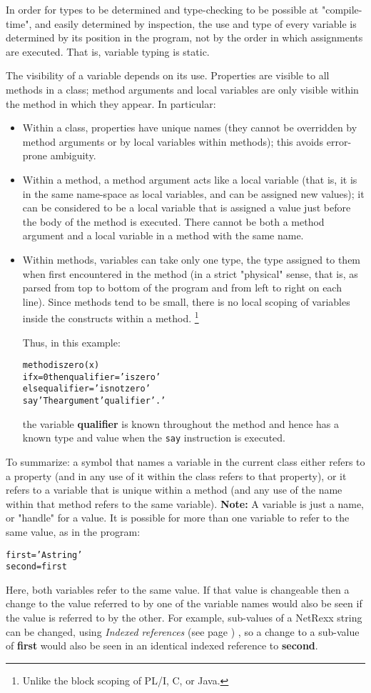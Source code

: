 In order for types to be determined and type-checking to be possible at
"compile-time", and easily determined by inspection, the use and
type of every variable is determined by its position in the program, not
by the order in which assignments are executed.
That is, variable typing is static.
 
The visibility of a variable depends on its use.  Properties are
visible to all methods in a class; method arguments and local variables
are only visible within the method in which they appear.  In particular:
\begin{itemize}
\item Within a class, properties have unique names (they cannot be
overridden by method arguments or by local variables within
methods); this avoids error-prone ambiguity.
\item 
Within a method, a method argument acts like a local variable (that is,
it is in the same name-space as local variables, and can be assigned new
values); it can be considered to be a local variable that is assigned a
value just before the body of the method is executed.  There cannot be
both a method argument and a local variable in a method with the same
name.
\item 
Within methods, variables can take only one type, the type assigned to
them when first encountered in the method (in a strict "physical"
sense, that is, as parsed from top to bottom of the program and from
left to right on each line).
Since methods tend to be small, there is no local scoping of variables
inside the constructs within a method.
\footnote{
Unlike the block scoping of PL/I, C, or Java.
}
 
Thus, in this example:
\begin{alltt}
method iszero(x)
  if x=0 then qualifier='is zero'
         else qualifier='is not zero'
  say 'The argument' qualifier'.'
\end{alltt}
the variable \textbf{qualifier} is known throughout the method and
hence has a known type and value when the \texttt{say} instruction is
executed.
\end{itemize}
 
To summarize: a symbol that names a variable in the current class either
refers to a property (and in any use of it within the class refers to
that property), or it refers to a variable that is unique within a
method (and any use of the name within that method refers to the same
variable).
\textbf{Note: }
A variable is just a name, or "handle" for a value.
It is possible for more than one variable to refer to the same value, as
in the program:
\begin{alltt}
first='A string'
second=first
\end{alltt}
Here, both variables refer to the same value.  If that value is
changeable then a change to the value referred to by one of the
variable names would also be seen if the value is referred to by the
other.
For example, sub-values of a NetRexx string can be changed, using
 \emph{Indexed references} (see page \pageref{refinstr}) , so a change to a
sub-value of \textbf{first} would also be seen in an identical indexed
reference to \textbf{second}.
